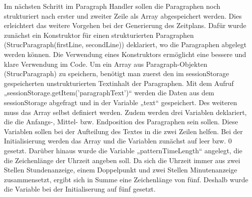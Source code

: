 {Im nächsten Schritt im Paragraph Handler sollen die Paragraphen noch strukturiert nach erster und zweiter Zeile als Array abgespeichert werden. Dies erleichtert das weitere Vorgehen bei der Generierung des Zeitplans. Dafür wurde zunächst ein Konstruktor für einen strukturierten Paragraphen (StrucParagraph(firstLine, secondLine)) deklariert, wo die Paragraphen abgelegt werden können. Die Verwendung eines Konstruktors ermöglicht eine bessere und klare Verwendung im Code. Um ein Array aus Paragraph-Objekten (StrucParagraph) zu speichern, benötigt man zuerst den im sessionStorage gespeicherten unstrukturierten Textinhalt der Paragraphen. Mit dem Aufruf „sessionStorage.getItem('paragraphText')“ werden die Daten aus dem sessionStorage abgefragt und in der Variable „text“ gespeichert. Des weiteren muss das Array selbst definiert werden. Zudem werden drei Variablen deklariert, die die Anfangs-, Mittel- bzw. Endposition des Paragraphen sein sollen. Diese Variablen sollen bei der Aufteilung des Textes in die zwei Zeilen helfen. Bei der Initialisierung werden das Array und die Variablen zunächst auf leer bzw. 0 gesetzt. Darüber hinaus wurde die Variable „patternTimeLength“ angelegt, die die Zeichenlänge der Uhrzeit angeben soll. Da sich die Uhrzeit immer aus zwei Stellen Stundenanzeige, einem Doppelpunkt und zwei Stellen Minutenanzeige zusammensetzt, ergibt sich in Summe eine Zeichenlänge von fünf. Deshalb wurde die Variable bei der Initialiserung auf fünf gesetzt.

}
